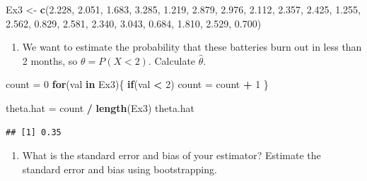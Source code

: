 \documentclass[
]{article}
\newenvironment{Shaded}{\begin{snugshade}}{\end{snugshade}}
\newcommand{\ControlFlowTok}[1]{\textcolor[rgb]{0.13,0.29,0.53}{\textbf{#1}}}
\newcommand{\DecValTok}[1]{\textcolor[rgb]{0.00,0.00,0.81}{#1}}
\newcommand{\FloatTok}[1]{\textcolor[rgb]{0.00,0.00,0.81}{#1}}
\newcommand{\KeywordTok}[1]{\textcolor[rgb]{0.13,0.29,0.53}{\textbf{#1}}}
\newcommand{\NormalTok}[1]{#1}
\newcommand{\OperatorTok}[1]{\textcolor[rgb]{0.81,0.36,0.00}{\textbf{#1}}}
\newcommand{\StringTok}[1]{\textcolor[rgb]{0.31,0.60,0.02}{#1}}
\providecommand{\tightlist}{%
  \setlength{\itemsep}{0pt}\setlength{\parskip}{0pt}}
\begin{document}
\begin{Shaded}
\begin{Highlighting}[]
\NormalTok{Ex3 <-}\StringTok{ }\KeywordTok{c}\NormalTok{(}\FloatTok{2.228}\NormalTok{, }\FloatTok{2.051}\NormalTok{, }\FloatTok{1.683}\NormalTok{, }\FloatTok{3.285}\NormalTok{, }\FloatTok{1.219}\NormalTok{, }\FloatTok{2.879}\NormalTok{, }\FloatTok{2.976}\NormalTok{, }\FloatTok{2.112}\NormalTok{, }\FloatTok{2.357}\NormalTok{, }\FloatTok{2.425}\NormalTok{, }\FloatTok{1.255}\NormalTok{, }\FloatTok{2.562}\NormalTok{, }\FloatTok{0.829}\NormalTok{, }\FloatTok{2.581}\NormalTok{, }\FloatTok{2.340}\NormalTok{, }\FloatTok{3.043}\NormalTok{, }\FloatTok{0.684}\NormalTok{, }\FloatTok{1.810}\NormalTok{, }\FloatTok{2.529}\NormalTok{, }\FloatTok{0.700}\NormalTok{)}
\end{Highlighting}
\end{Shaded}

\begin{enumerate}
\def\labelenumi{\arabic{enumi}.}
\tightlist
\item
  We want to estimate the probability that these batteries burn out in
  less than 2 months, so \(\theta=P(X<2)\). Calculate \(\hat{\theta}\).
\end{enumerate}

\begin{Shaded}
\begin{Highlighting}[]
\NormalTok{count =}\StringTok{ }\DecValTok{0}
\ControlFlowTok{for}\NormalTok{(val }\ControlFlowTok{in}\NormalTok{ Ex3)\{}
  \ControlFlowTok{if}\NormalTok{(val }\OperatorTok{<}\StringTok{ }\DecValTok{2}\NormalTok{) count =}\StringTok{ }\NormalTok{count }\OperatorTok{+}\StringTok{ }\DecValTok{1}
\NormalTok{\}}

\NormalTok{theta.hat =}\StringTok{ }\NormalTok{count }\OperatorTok{/}\StringTok{ }\KeywordTok{length}\NormalTok{(Ex3)}
\NormalTok{theta.hat}
\end{Highlighting}
\end{Shaded}

\begin{verbatim}
## [1] 0.35
\end{verbatim}

\begin{enumerate}
\def\labelenumi{\arabic{enumi}.}
\setcounter{enumi}{1}
\tightlist
\item
  What is the standard error and bias of your estimator? Estimate the
  standard error and bias using bootstrapping.
\end{enumerate}
\end{document}
